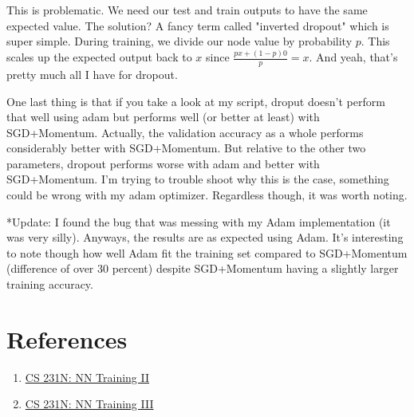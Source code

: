 \documentclass[12pt]{article}
\begin{document}
This is problematic. We need our test and train outputs to have the same expected value. The solution? 
A fancy term called "inverted dropout" which is super simple. During training, we
divide our node value by probability $p$. This scales up the expected output back to $x$ since 
$\frac{px + (1-p)0}{p} = x$. And yeah, that's pretty much all I have for dropout. 

One last thing is that if you take a look at my script, droput doesn't perform that well using adam 
but performs well (or better at least) with SGD+Momentum. Actually, the validation accuracy as a 
whole performs considerably better with SGD+Momentum. But relative to the other two parameters, dropout
performs worse with adam and better with SGD+Momentum. I'm trying to trouble shoot why this is the case, 
something could be wrong with my adam optimizer. Regardless though, it was worth noting. 

*Update: I found the bug that was messing with my Adam implementation (it was very silly). Anyways, the 
results are as expected using Adam. It's interesting to note though how well Adam fit the training
set compared to SGD+Momentum (difference of over 30 percent) despite SGD+Momentum having a slightly 
larger training accuracy. 
\section{References}

\begin{enumerate}
    \item \href{https://cs231n.github.io/neural-networks-2}{CS 231N: NN Training II}
    \item \href{https://cs231n.github.io/neural-networks-3}{CS 231N: NN Training III}
\end{enumerate}
\end{document}
